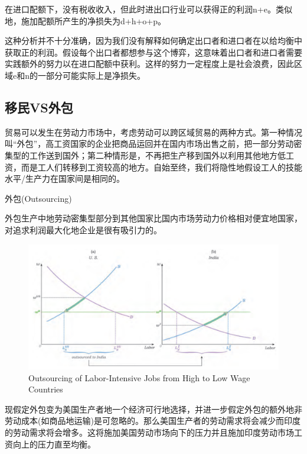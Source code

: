\documentclass{article}
\begin{document}
在进口配额下，没有税收收入，但此时进出口行业可以获得正的利润n+e。类似地，施加配额所产生的净损失为d+h+o+p。

这种分析并不十分准确，因为我们没有解释如何确定出口者和进口者在以给均衡中获取正的利润。假设每个出口者都想参与这个博弈，这意味着出口者和进口者需要实践额外的努力以在进口配额中获利。这样的努力一定程度上是社会浪费，因此区域e和n的一部分可能实际上是净损失。

\subsection{移民VS外包}

贸易可以发生在劳动力市场中，考虑劳动可以跨区域贸易的两种方式。第一种情况叫“外包”，高工资国家的企业把商品运回并在国内市场出售之前，把一部分劳动密集型的工作送到国外；第二种情形是，不再把生产移到国外以利用其他地方低工资，而是工人们转移到工资较高的地方。自始至终，我们将隐性地假设工人的技能水平/生产力在国家间是相同的。

外包(Outsourcing)

外包生产中地劳动密集型部分到其他国家比国内市场劳动力价格相对便宜地国家，对追求利润最大化地企业是很有吸引力的。

\begin{figure}[H] %
	\centering %
	\includegraphics[width=1\textwidth]{20_6} %
	\caption{Outsourcing of Labor-Intensive Jobs from High to Low Wage Countries} %
	\label{Fig.main7} %
\end{figure}

现假定外包变为美国生产者地一个经济可行地选择，并进一步假定外包的额外地非劳动成本(如商品地运输)是可忽略的。那么美国生产者的劳动需求将会减少而印度的劳动需求将会增多。这将施加美国劳动市场向下的压力并且施加印度劳动市场工资向上的压力直至均衡。
\end{document}

